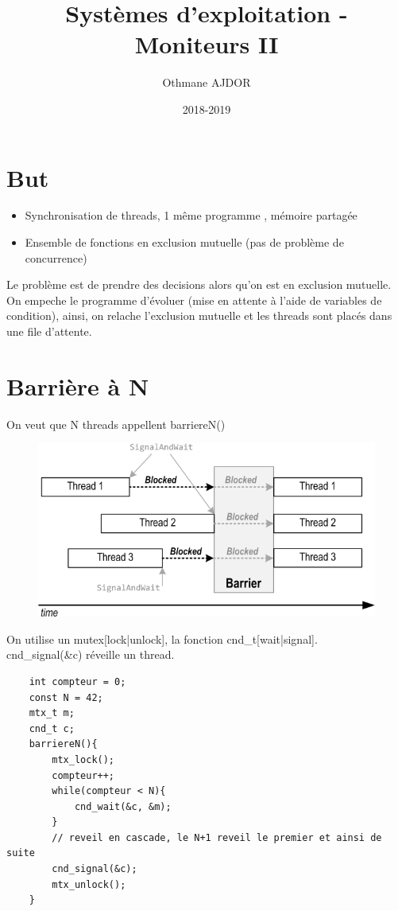 \documentclass[11pt]{article}
\title{Systèmes d'exploitation - Moniteurs II}
\author{Othmane AJDOR}
\date{2018-2019}
\begin{document}
\maketitle

\pagebreak
\tableofcontents
\pagebreak

\section{But}
\begin{itemize}
	\item Synchronisation de threads, 1 même programme , mémoire partagée
	\item Ensemble de fonctions en exclusion mutuelle (pas de problème de concurrence)
\end{itemize}
Le problème est de prendre des decisions alors qu'on est en exclusion mutuelle.
On empeche le programme d'évoluer (mise en attente à l'aide de variables de condition), ainsi, on relache l'exclusion mutuelle et les threads sont placés dans une file d'attente.

\section{Barrière à N}
On veut que N threads appellent barriereN()
\begin{figure}[h!]
	\centering
	\includegraphics[scale=2]{img/barrier.png}
\end{figure}

On utilise un mutex[lock|unlock], la fonction cnd\_t[wait|signal].\\
cnd\_signal(\&c) réveille un thread.

\begin{verbatim}
	int compteur = 0;
	const N = 42;
	mtx_t m;
	cnd_t c;
	barriereN(){
		mtx_lock();
		compteur++;
		while(compteur < N){
			cnd_wait(&c, &m);
		}
		// reveil en cascade, le N+1 reveil le premier et ainsi de suite
		cnd_signal(&c); 
		mtx_unlock();
	}
\end{verbatim}
\end{document}
